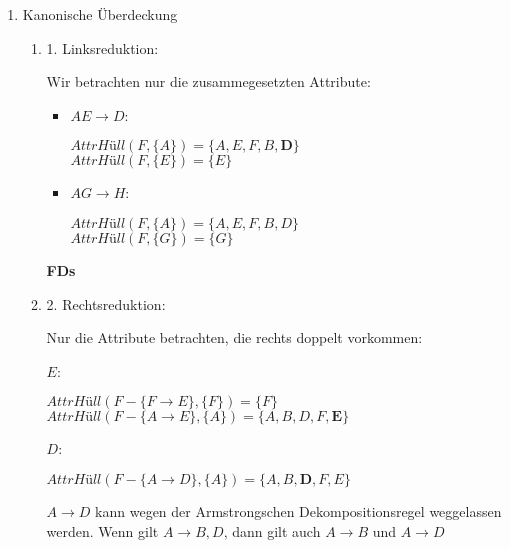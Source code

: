 \documentclass{lehramt-informatik}
\begin{document}
\begin{antwort}

\begin{enumerate}

\item Kanonische Überdeckung

\begin{enumerate}

%

\item 1. Linksreduktion:

Wir betrachten nur die zusammegesetzten Attribute:

\begin{itemize}
\item $AE \rightarrow D$:

$\textit{AttrHüll}(F, \{A\}) = \{A, E, F, B, \textbf{D}\}$ \\
$\textit{AttrHüll}(F, \{E\}) = \{E\}$

\item $AG \rightarrow H$:

$\textit{AttrHüll}(F, \{A\}) = \{A, E, F, B, D\}$ \\
$\textit{AttrHüll}(F, \{G\}) = \{G\}$
\end{itemize}

\textbf{FDs}


%

\item 2. Rechtsreduktion:

Nur die Attribute betrachten, die rechts doppelt vorkommen:

$E$:

$\textit{AttrHüll}(F - \{F \rightarrow E\}, \{F\}) = \{F\}$ \\
$\textit{AttrHüll}(F - \{A \rightarrow E\}, \{A\}) = \{A, B, D, F, \textbf{E}\}$

$D$:

$\textit{AttrHüll}(F - \{A \rightarrow D\}, \{A\}) = \{A, B, \textbf{D}, F, E\}$

$A \rightarrow D$ kann wegen der Armstrongschen Dekompositionsregel
weggelassen werden. Wenn gilt $A \rightarrow B, D$, dann gilt auch $A
\rightarrow B$ und $A \rightarrow D$


\end{enumerate}
\end{enumerate}
\end{antwort}
\end{document}
